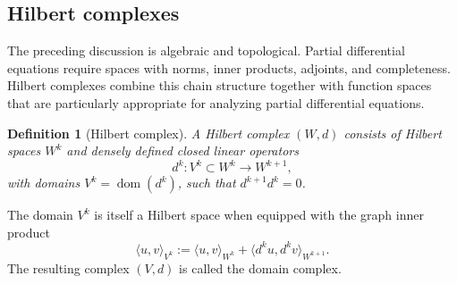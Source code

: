 \documentclass{article}
\newtheorem{definition}{Definition}[section]
\DeclareMathOperator{\curl}{curl}
\begin{document}


\subsection{Hilbert complexes}

The preceding discussion is algebraic and topological.  Partial differential
equations require spaces with norms, inner products, adjoints, and completeness. Hilbert complexes combine this chain structure together with function spaces that are particularly appropriate for analyzing partial differential equations. 

\begin{definition}[Hilbert complex]\label{def:hilbert-complex-expanded}
	A Hilbert complex $(W,d)$ consists of Hilbert spaces $W^k$ and densely
	defined closed linear operators
	\[
    	d^k : V^k \subset W^k \longrightarrow W^{k+1},
	\]
    with domains $V^k=\operatorname{dom}(d^k)$, such that $d^{k+1}d^k=0$.
\end{definition}

The domain $V^k$ is itself a Hilbert space when equipped with the graph inner
product
\[
\langle u,v\rangle_{V^k}
	:=
	\langle u,v\rangle_{W^k}
	+
	\langle d^k u,d^k v\rangle_{W^{k+1}}.
\]
The resulting complex $(V,d)$ is called the domain complex.  
\end{document}
